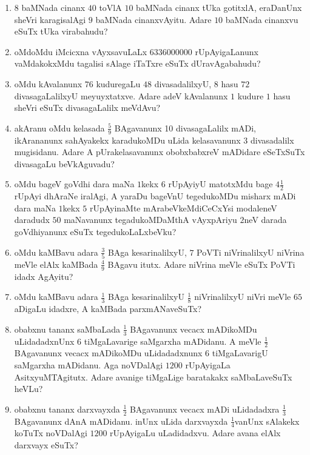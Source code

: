 \begin{enumerate}
\item $8$ baMNada cinanx $40$ toVlA $10$ baMNada cinanx tUka gotitxlA,
eraDanUnx sheVri karagisalAgi $9$ baMNada cinanxvAyitu. Adare $10$
baMNada cinanxvu eSuTx tUka virabahudu?

\item oMdoMdu iMcicxna vAyxsavuLaLx $6336000000$ rUpAyigaLanunx
vaMdakokxMdu tagalisi sAlage iTaTxre eSuTx dUravAgabahudu?

\item oMdu kAvalanunx $76$ kuduregaLu $48$ divasadalilxyU, $8$ hasu
$72$ divasagaLalilxyU meyuyxtatxve. Adare adeV kAvalanunx $1$ kudure
$1$ hasu sheVri eSuTx divasagaLalilx meVdAvu?

\item akAranu oMdu kelasada $\frac{5}{9}$ BAgavanunx 10 divasagaLalilx
mADi, ikArananunx sahAyakekx karadukoMDu uLida kelasavanunx $3$
divasadalilx mugisidanu. Adare A pUrakelasavanunx obobxbabxreV
mADidare eSeTxSuTx divasagaLu beVkAguvadu?

\item oMdu bageV goVdhi dara maNa $1$kekx $6$ rUpAyiyU matotxMdu bage
$4\frac{1}{2}$ rUpAyi dhAraNe iralAgi, A yaraDu bageVnU tegedukoMDu
misharx mADi dara maNa $1$kekx $5$ rUpAyinaMte mArabeVkeMdiCeCxYsi
modaleneV daradudx $50$ maNavanunx tegadukoMDaMthA vAyxpAriyu $2$neV
darada goVdhiyanunx eSuTx tegedukoLaLxbeVku?

\item oMdu kaMBavu adara $\frac{3}{5}$ BAga kesarinalilxyU, $7$ PoVTi
niVrinalilxyU niVrina meVle elAlx kaMBada $\frac{4}{9}$ BAgavu
itutx. Adare niVrina meVle eSuTx PoVTi idadx AgAyitu?

\item oMdu kaMBavu adara $\frac{1}{3}$ BAga kesarinalilxyU
$\frac{1}{8}$ niVrinalilxyU niVri meVle $65$ aDigaLu idadxre, A
kaMBada parxmANaveSuTx?

\item obabxnu tananx saMbaLada $\frac{1}{3}$ BAgavanunx vecacx
mADikoMDu uLidadadxnUnx $6$ tiMgaLavarige saMgarxha mADidanu. A meVle
$\frac{1}{2}$ BAgavanunx vecacx mADikoMDu uLidadadxnunx $6$
tiMgaLavarigU saMgarxha mADidanu. Aga noVDalAgi $1200$ rUpAyigaLa
AsitxyuMTAgitutx. Adare avanige tiMgaLige baratakakx saMbaLaveSuTx
heVLu?

\item obabxnu tananx darxvayxda $\frac{1}{2}$ BAgavanunx vecacx mADi
uLidadadxra $\frac{1}{3}$ BAgavanunx dAnA mADidanu. inUnx uLida
darxvayxda $\frac{1}{4}$vanUnx sAlakekx koTuTx noVDalAgi $1200$
rUpAyigaLu uLadidadxvu. Adare avana elAlx darxvayx eSuTx?


\end{enumerate}
